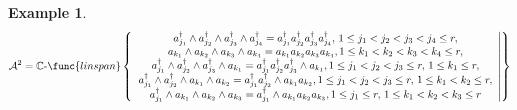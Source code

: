 \documentclass[aps,preprint]{revtex4}
\newtheorem{example}[theorem]{Example}
\begin{document}
\begin{enumerate}
\begin{enumerate}
\begin{enumerate}
\begin{example}
\begin{equation}
\mathcal{A}^{2}=\mathbb{C}\text{-}\func{linspan}\left\{ \left. 
\begin{array}{c}
a_{j_{1}}^{\dagger }\wedge a_{j_{2}}^{\dagger }\wedge a_{j_{3}}^{\dagger
}\wedge a_{j_{4}}^{\dagger }=a_{j_{1}}^{\dagger }a_{j_{2}}^{\dagger
}a_{j_{3}}^{\dagger }a_{j_{4}}^{\dagger },\,1\leq
j_{1}<j_{2}<j_{3}<j_{4}\leq r, \\ 
a_{k_{1}}\wedge a_{k_{2}}\wedge a_{k_{3}}\wedge
a_{k_{4}}=a_{k_{1}}a_{k_{2}}a_{k_{3}}a_{k_{4}},1\leq
k_{1}<k_{2}<k_{3}<k_{4}\leq r, \\ 
a_{j_{1}}^{\dagger }\wedge a_{j_{2}}^{\dagger }\wedge a_{j_{3}}^{\dagger
}\wedge a_{k_{1}}=a_{j_{1}}^{\dagger }a_{j_{2}}^{\dagger }a_{j_{3}}^{\dagger
}\wedge a_{k_{1}},1\leq j_{1}<j_{2}<j_{3}\leq r,\,1\leq k_{1}\leq r, \\ 
a_{j_{1}}^{\dagger }\wedge a_{j_{2}}^{\dagger }\wedge a_{k_{1}}\wedge
a_{k_{2}}=a_{j_{1}}^{\dagger }a_{j_{2}}^{\dagger }\wedge
a_{k_{1}}a_{k_{2}},1\leq j_{1}<j_{2}<j_{3}\leq r,\,1\leq k_{1}<k_{2}\leq r,
\\ 
a_{j_{1}}^{\dagger }\wedge a_{k_{1}}\wedge a_{k_{2}}\wedge
a_{k_{3}}=a_{j_{1}}^{\dagger }\wedge a_{k_{1}}a_{k_{2}}a_{k_{3}},1\leq
j_{1}\leq r,\,1\leq k_{1}<k_{2}<k_{3}\leq r%
\end{array}%
\right\vert \right\}
\end{equation}
\end{example}


\end{enumerate}
\end{enumerate}
\end{enumerate}
\end{document}
